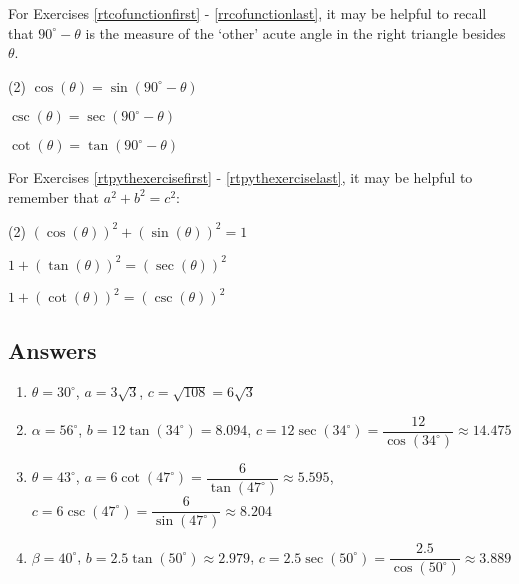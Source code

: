 For Exercises \ref{rtcofunctionfirst} - \ref{rrcofunctionlast}, it may be helpful to recall that $90^{\circ} - \theta$ is the measure of the `other' acute angle in the right triangle besides $\theta$.


\begin{tasks}[resume](2)
\task  $\cos(\theta) = \sin\left( 90^{\circ} - \theta \right) $ \label{rtcofunctionfirst} \label{cofunctionforeshadowing}

\task  $\csc(\theta) = \sec\left( 90^{\circ} - \theta \right) $

\task  $\cot(\theta) = \tan\left( 90^{\circ} - \theta \right) $ \label{rrcofunctionlast}

\end{tasks}

For Exercises \ref{rtpythexercisefirst} - \ref{rtpythexerciselast}, it may be helpful to remember that $a^2+b^2 = c^2$:

\begin{tasks}[resume](2)
\task  $(\cos(\theta))^2 + (\sin(\theta))^2 = 1$ \label{rtpythexercisefirst}

\task  $1 + (\tan(\theta))^2 = (\sec(\theta))^2$

\task  $ 1 + (\cot(\theta))^2 = (\csc(\theta))^2$ \label{rtpythexerciselast} \label{rtidentitylast}

\end{tasks}

\clearpage

\subsection{Answers}

\begin{enumerate}

\item  $\theta = 30^{\circ}$, $a = 3\sqrt{3}$, $c = \sqrt{108} = 6\sqrt{3}$

\item  $\alpha = 56^{\circ}$, $b = 12 \tan(34^{\circ}) =  8.094$, $c = 12\sec(34^{\circ}) = \dfrac{12}{\cos(34^{\circ})} \approx 14.475$

\item  $\theta = 43^{\circ}$, $a = 6\cot(47^{\circ}) = \dfrac{6}{\tan(47^{\circ})} \approx 5.595$, $c = 6\csc(47^{\circ}) = \dfrac{6}{\sin(47^{\circ})} \approx 8.204$

\item  $\beta = 40^{\circ}$, $b = 2.5 \tan(50^{\circ}) \approx 2.979$, $c = 2.5\sec(50^{\circ}) = \dfrac{2.5}{\cos(50^{\circ})} \approx 3.889$

\setcounter{HW}{\value{enumi}}

\end{enumerate}


